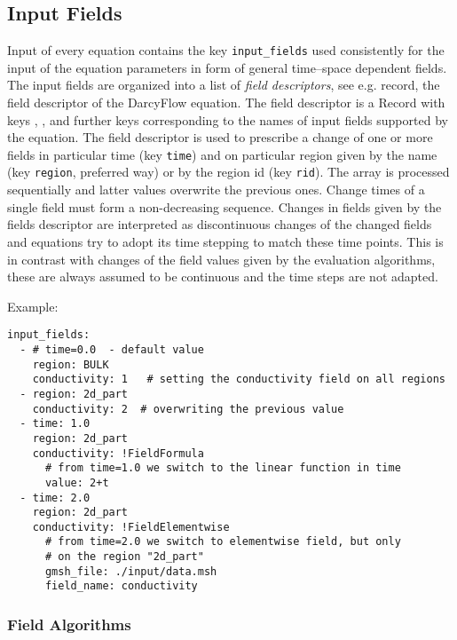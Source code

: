 \subsection{Input Fields}
Input of every equation contains the key \verb'input_fields' used consistently for the input of the equation parameters 
in form of general time--space dependent fields.  The input fields are organized into a list of {\it field descriptors}, see 
e.g.  record, the field descriptor of the DarcyFlow equation.
The field descriptor is a Record with keys 
, 
, 
and further keys corresponding to the 
names of input fields supported by the equation. The field descriptor is used to prescribe
a change of one or more fields in particular time (key \verb'time') and on particular region given  by the name (key \verb'region', preferred way) 
or by the region id (key \verb'rid'). 
The array is processed sequentially and latter values overwrite the previous ones. Change times of a single field must form a non-decreasing sequence.
Changes in fields given by the fields descriptor are interpreted as discontinuous changes of the changed fields
and equations try to adopt its time stepping to match these time points. This is in contrast with changes of the field values given by
the evaluation algorithms, these are always assumed to be continuous and the time steps are not adapted. 



Example:
\begin{verbatim}
input_fields:
  - # time=0.0  - default value
    region: BULK
    conductivity: 1   # setting the conductivity field on all regions
  - region: 2d_part
    conductivity: 2  # overwriting the previous value
  - time: 1.0
    region: 2d_part
    conductivity: !FieldFormula
      # from time=1.0 we switch to the linear function in time
      value: 2+t
  - time: 2.0
    region: 2d_part
    conductivity: !FieldElementwise
      # from time=2.0 we switch to elementwise field, but only
      # on the region "2d_part"
      gmsh_file: ./input/data.msh
      field_name: conductivity
\end{verbatim}



\subsubsection{Field Algorithms}
\label{sec:Fields}\hypertarget{sec:Fields}{}

